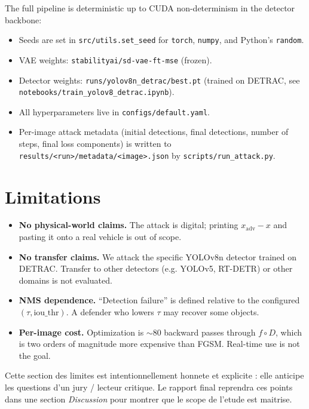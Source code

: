 \documentclass[11pt,a4paper]{article}
\begin{document}
The full pipeline is deterministic up to CUDA non-determinism in the detector
backbone:

\begin{itemize}[leftmargin=*, itemsep=2pt]
\item Seeds are set in \texttt{src/utils.set\_seed} for \texttt{torch},
\texttt{numpy}, and Python's \texttt{random}.
\item VAE weights: \texttt{stabilityai/sd-vae-ft-mse} (frozen).
\item Detector weights: \texttt{runs/yolov8n\_detrac/best.pt} (trained on
DETRAC, see \texttt{notebooks/train\_yolov8\_detrac.ipynb}).
\item All hyperparameters live in \texttt{configs/default.yaml}.
\item Per-image attack metadata (initial detections, final detections,
number of steps, final loss components) is written to
\texttt{results/<run>/metadata/<image>.json} by
\texttt{scripts/run\_attack.py}.
\end{itemize}

\section{Limitations}\label{sec:limits}

\begin{itemize}[leftmargin=*, itemsep=2pt]
\item \textbf{No physical-world claims.} The attack is digital; printing
$x_{\text{adv}} - x$ and pasting it onto a real vehicle is out of scope.
\item \textbf{No transfer claims.} We attack the specific YOLOv8n detector
trained on DETRAC. Transfer to other detectors (e.g. YOLOv5, RT-DETR) or
other domains is not evaluated.
\item \textbf{NMS dependence.} ``Detection failure'' is defined relative to
the configured $(\tau, \text{iou\_thr})$. A defender who lowers $\tau$ may
recover some objects.
\item \textbf{Per-image cost.} Optimization is $\sim 80$ backward passes
through $f \circ D$, which is two orders of magnitude more expensive than
FGSM. Real-time use is not the goal.
\end{itemize}

\begin{supervisornote}
Cette section des limites est intentionnellement honnete et explicite :
elle anticipe les questions d'un jury / lecteur critique. Le rapport
final reprendra ces points dans une section \emph{Discussion} pour
montrer que le scope de l'etude est maitrise.
\end{supervisornote}
\end{document}
